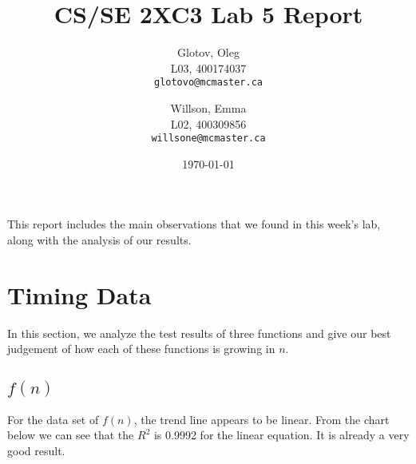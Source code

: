 \documentclass[12pt]{article}
\title{CS/SE 2XC3 Lab 5 Report}
\author{
  Glotov, Oleg\\ L03, 400174037\\
  \texttt{glotovo@mcmaster.ca}
  \and
  Willson, Emma\\ L02, 400309856\\
  \texttt{willsone@mcmaster.ca}
  }
\date{\today}
\begin{document}
\maketitle

This report includes the main observations that we found in this week's lab, along with the analysis of our results.

\newpage 
\section{Timing Data}
In this section, we analyze the test results of three functions and give our best judgement of how each of these functions is growing in $n$.
\subsection{\(f(n)\)}
For the data set of $f(n)$, the trend line appears to be linear. From the chart below we can see that the $R^2$ is 0.9992 for the linear equation. It is already a very good result.
\end{document}
